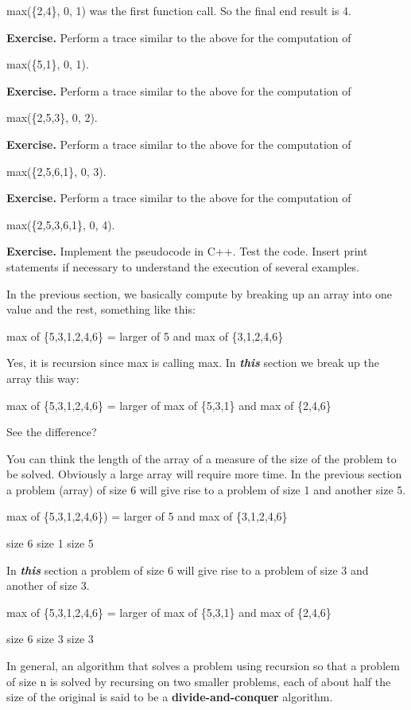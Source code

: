 \documentclass[
]{article}
\begin{document}
max(\{2,4\}, 0, 1) was the first function call. So the final end result
is 4.

\textbf{Exercise.} Perform a trace similar to the above for the
computation of

max(\{5,1\}, 0, 1).

\textbf{Exercise.} Perform a trace similar to the above for the
computation of

max(\{2,5,3\}, 0, 2).

\textbf{Exercise.} Perform a trace similar to the above for the
computation of

max(\{2,5,6,1\}, 0, 3).

\textbf{Exercise.} Perform a trace similar to the above for the
computation of

max(\{2,5,3,6,1\}, 0, 4).

\textbf{Exercise.} Implement the pseudocode in C++. Test the code.
Insert print statements if necessary to understand the execution of
several examples.

In the previous section, we basically compute by breaking up an array
into one value and the rest, something like this:

max of \{5,3,1,2,4,6\} = larger of 5 and max of \{3,1,2,4,6\}

Yes, it is recursion since max is calling max. In \emph{\textbf{this}}
section we break up the array this way:

max of \{5,3,1,2,4,6\} = larger of max of \{5,3,1\} and max of \{2,4,6\}

See the difference?

You can think the length of the array of a measure of the size of the
problem to be solved. Obviously a large array will require more time. In
the previous section a problem (array) of size 6 will give rise to a
problem of size 1 and another size 5.

max of \{5,3,1,2,4,6\}) = larger of 5 and max of \{3,1,2,4,6\}

size 6 size 1 size 5

In \emph{\textbf{this}} section a problem of size 6 will give rise to a
problem of size 3 and another of size 3.

max of \{5,3,1,2,4,6\} = larger of max of \{5,3,1\} and max of \{2,4,6\}

size 6 size 3 size 3

In general, an algorithm that solves a problem using recursion so that a
problem of size n is solved by recursing on two smaller problems, each
of about half the size of the original is said to be a
\textbf{divide-and-conquer} algorithm.
\end{document}
